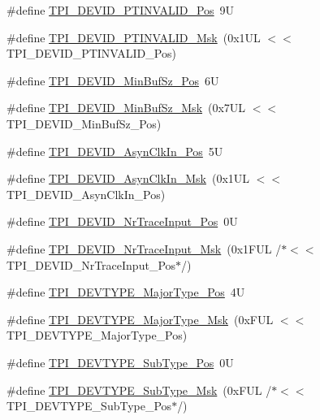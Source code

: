 \begin{DoxyCompactItemize}
\item 
\#define \mbox{\hyperlink{group___c_m_s_i_s___t_p_i_ga974cccf4c958b4a45cb71c7b5de39b7b}{T\+P\+I\+\_\+\+D\+E\+V\+I\+D\+\_\+\+P\+T\+I\+N\+V\+A\+L\+I\+D\+\_\+\+Pos}}~9U
\item 
\#define \mbox{\hyperlink{group___c_m_s_i_s___t_p_i_ga1ca84d62243e475836bba02516ba6b97}{T\+P\+I\+\_\+\+D\+E\+V\+I\+D\+\_\+\+P\+T\+I\+N\+V\+A\+L\+I\+D\+\_\+\+Msk}}~(0x1\+U\+L $<$$<$ T\+P\+I\+\_\+\+D\+E\+V\+I\+D\+\_\+\+P\+T\+I\+N\+V\+A\+L\+I\+D\+\_\+\+Pos)
\item 
\#define \mbox{\hyperlink{group___c_m_s_i_s___t_p_i_ga3f7da5de2a34be41a092e5eddd22ac4d}{T\+P\+I\+\_\+\+D\+E\+V\+I\+D\+\_\+\+Min\+Buf\+Sz\+\_\+\+Pos}}~6U
\item 
\#define \mbox{\hyperlink{group___c_m_s_i_s___t_p_i_ga939e068ff3f1a65b35187ab34a342cd8}{T\+P\+I\+\_\+\+D\+E\+V\+I\+D\+\_\+\+Min\+Buf\+Sz\+\_\+\+Msk}}~(0x7\+U\+L $<$$<$ T\+P\+I\+\_\+\+D\+E\+V\+I\+D\+\_\+\+Min\+Buf\+Sz\+\_\+\+Pos)
\item 
\#define \mbox{\hyperlink{group___c_m_s_i_s___t_p_i_gab382b1296b5efd057be606eb8f768df8}{T\+P\+I\+\_\+\+D\+E\+V\+I\+D\+\_\+\+Asyn\+Clk\+In\+\_\+\+Pos}}~5U
\item 
\#define \mbox{\hyperlink{group___c_m_s_i_s___t_p_i_gab67830557d2d10be882284275025a2d3}{T\+P\+I\+\_\+\+D\+E\+V\+I\+D\+\_\+\+Asyn\+Clk\+In\+\_\+\+Msk}}~(0x1\+U\+L $<$$<$ T\+P\+I\+\_\+\+D\+E\+V\+I\+D\+\_\+\+Asyn\+Clk\+In\+\_\+\+Pos)
\item 
\#define \mbox{\hyperlink{group___c_m_s_i_s___t_p_i_ga80ecae7fec479e80e583f545996868ed}{T\+P\+I\+\_\+\+D\+E\+V\+I\+D\+\_\+\+Nr\+Trace\+Input\+\_\+\+Pos}}~0U
\item 
\#define \mbox{\hyperlink{group___c_m_s_i_s___t_p_i_gabed454418d2140043cd65ec899abd97f}{T\+P\+I\+\_\+\+D\+E\+V\+I\+D\+\_\+\+Nr\+Trace\+Input\+\_\+\+Msk}}~(0x1\+F\+U\+L /$\ast$$<$$<$ T\+P\+I\+\_\+\+D\+E\+V\+I\+D\+\_\+\+Nr\+Trace\+Input\+\_\+\+Pos$\ast$/)
\item 
\#define \mbox{\hyperlink{group___c_m_s_i_s___t_p_i_ga69c4892d332755a9f64c1680497cebdd}{T\+P\+I\+\_\+\+D\+E\+V\+T\+Y\+P\+E\+\_\+\+Major\+Type\+\_\+\+Pos}}~4U
\item 
\#define \mbox{\hyperlink{group___c_m_s_i_s___t_p_i_gaecbceed6d08ec586403b37ad47b38c88}{T\+P\+I\+\_\+\+D\+E\+V\+T\+Y\+P\+E\+\_\+\+Major\+Type\+\_\+\+Msk}}~(0x\+F\+U\+L $<$$<$ T\+P\+I\+\_\+\+D\+E\+V\+T\+Y\+P\+E\+\_\+\+Major\+Type\+\_\+\+Pos)
\item 
\#define \mbox{\hyperlink{group___c_m_s_i_s___t_p_i_ga0c799ff892af5eb3162d152abc00af7a}{T\+P\+I\+\_\+\+D\+E\+V\+T\+Y\+P\+E\+\_\+\+Sub\+Type\+\_\+\+Pos}}~0U
\item 
\#define \mbox{\hyperlink{group___c_m_s_i_s___t_p_i_ga5b2fd7dddaf5f64855d9c0696acd65c1}{T\+P\+I\+\_\+\+D\+E\+V\+T\+Y\+P\+E\+\_\+\+Sub\+Type\+\_\+\+Msk}}~(0x\+F\+U\+L /$\ast$$<$$<$ T\+P\+I\+\_\+\+D\+E\+V\+T\+Y\+P\+E\+\_\+\+Sub\+Type\+\_\+\+Pos$\ast$/)
\end{DoxyCompactItemize}


